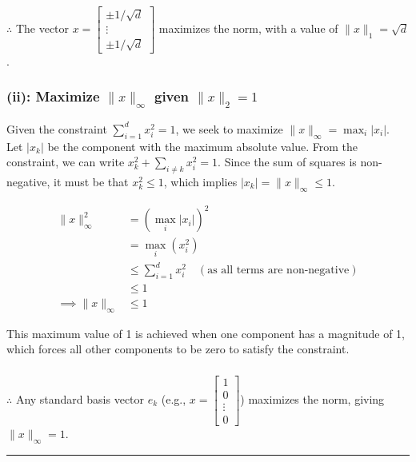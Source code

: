\documentclass{article}
\begin{document}
\subsubsection*{\normalfont}{$\therefore$ The vector $x = \begin{bmatrix} \pm 1/\sqrt{d} \\ \vdots \\ \pm 1/\sqrt{d} \end{bmatrix}$ maximizes the norm, with a value of $\|x\|_1 = \sqrt{d}$.}

\subsubsection*{(ii): Maximize $\|x\|_{\infty}$ given $\|x\|_{2}=1$}
\parbox{\textwidth}{
Given the constraint $\sum_{i=1}^d x_i^2 = 1$, we seek to maximize $\|x\|_{\infty} = \max_i |x_i|$. Let $|x_k|$ be the component with the maximum absolute value. From the constraint, we can write $x_k^2 + \sum_{i \ne k} x_i^2 = 1$. Since the sum of squares is non-negative, it must be that $x_k^2 \le 1$, which implies $|x_k| = \|x\|_{\infty} \le 1$.
}
\begin{align*}
    \|x\|_{\infty}^2 &= (\max_i |x_i|)^2 \\
    &= \max_i (x_i^2) \\
    &\le \sum_{i=1}^d x_i^2 \quad (\text{as all terms are non-negative}) \\
    &\le 1 \\
    \implies \|x\|_{\infty} &\le 1
\end{align*}
\parbox{\textwidth}{
This maximum value of 1 is achieved when one component has a magnitude of 1, which forces all other components to be zero to satisfy the constraint.
}
\subsubsection*{\normalfont}{$\therefore$ Any standard basis vector $e_k$ (e.g., $x=\begin{bmatrix} 1 \\ 0 \\ \vdots \\ 0 \end{bmatrix}$) maximizes the norm, giving $\|x\|_{\infty}=1$.}

\noindent\rule{\textwidth}{0.4pt}\\

\newpage
\end{document}
